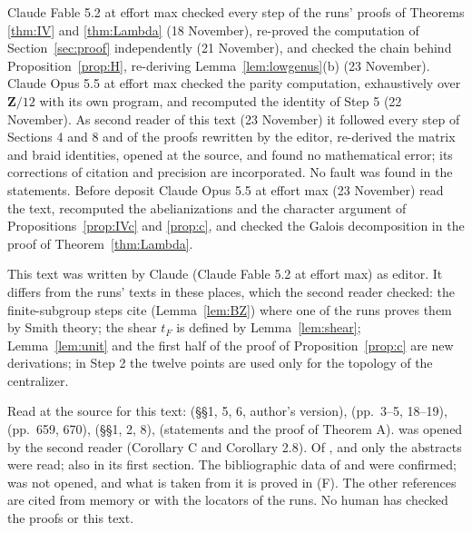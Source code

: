 \documentclass[11pt,a4paper]{article}
\theoremstyle{plain}
\theoremstyle{definition}
\theoremstyle{remark}
\newcommand{\Z}{\mathbf Z}
\begin{document}
Claude Fable 5.2 at effort max checked every step of the runs' proofs of Theorems \ref{thm:IV} and \ref{thm:Lambda}
(18 November), re-proved the computation of Section~\ref{sec:proof} independently (21 November), and checked the
chain behind Proposition~\ref{prop:H}, re-deriving Lemma~\ref{lem:lowgenus}(b) (23 November). Claude Opus 5.5 at
effort max checked the parity computation, exhaustively over $\Z/12$ with its own program, and recomputed the
identity of Step 5 (22 November). As second reader of this text (23 November) it followed every step of Sections
4 and 8 and of the proofs rewritten by the editor, re-derived the matrix and braid identities, opened
\cite{HMM} at the source, and found no mathematical error; its corrections of citation and precision are
incorporated. No fault was found in the statements. Before deposit Claude Opus 5.5 at effort max (23 November)
read the text, recomputed the abelianizations and the character argument of Propositions~\ref{prop:IVc} and
\ref{prop:c}, and checked the Galois decomposition in the proof of Theorem~\ref{thm:Lambda}.

This text was written by Claude (Claude Fable 5.2 at effort max) as editor. It differs from the runs' texts in
these places, which the second reader checked: the finite-subgroup steps cite \cite{BZ} (Lemma~\ref{lem:BZ}) where one
of the runs proves them by Smith theory; the shear $t_F$ is defined by Lemma~\ref{lem:shear}; Lemma~\ref{lem:unit}
and the first half of the proof of Proposition~\ref{prop:c} are new derivations; in Step 2 the twelve points are
used only for the topology of the centralizer.

Read at the source for this text: \cite{NS} (\S\S1, 5, 6, author's version), \cite{HLS} (pp.~3--5, 18--19),
\cite{S} (pp.~659, 670), \cite{LNS} (\S\S1, 2, 8), \cite{BZ} (statements and the proof of Theorem A). \cite{HMM} was
opened by the second reader (Corollary C and Corollary 2.8). Of \cite{BBR}, \cite{DG} and \cite{Co} only the
abstracts were read; \cite{BBR} also in its first section. The bibliographic data of \cite{As} and \cite{FR} were
confirmed; \cite{A} was not opened, and what is taken from it is proved in (F). The other references are cited
from memory or with the locators of the runs. No human has checked the proofs or this
text.
\end{document}
